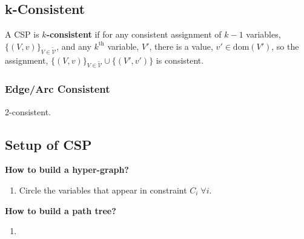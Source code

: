 \subsection{k-Consistent}
\begin{definition}
    A CSP is \textbf{\(k\)-consistent} if for any consistent assignment of \(k - 1\) variables, \(\{(V, v)\}_{V \in \tilde{\mathcal{V}}}\), and any \(k^\text{th}\) variable, \(V'\), there is a value, \(v' \in \text{dom}(V')\), so the assignment, \(\{(V, v)\}_{V \in \tilde{\mathcal{V}}} \cup \{(V', v')\}\) is consistent.
\end{definition}

\subsubsection{Edge/Arc Consistent}
\begin{definition}
    2-consistent.
\end{definition}
\newpage

\subsection{Setup of CSP}

\begin{example}
\end{example}
\newpage

\begin{process} \textbf{How to build a hyper-graph?}
    \begin{enumerate}
        \item Circle the variables that appear in constraint $C_i \; \forall i$.
    \end{enumerate}
\end{process}

\begin{example}
\end{example}

\begin{process} \textbf{How to build a path tree?}
    \begin{enumerate}
        \item 
    \end{enumerate}
\end{process}

\begin{example}
\end{example}

